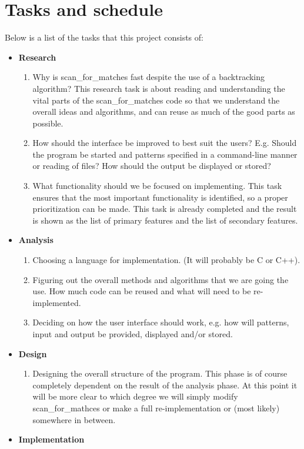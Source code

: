 \documentclass[12pt]{article}
\begin{document}
\section{Tasks and schedule}
Below is a list of the tasks that this project consists of:
\begin{itemize}
\item \textbf{Research} 
\begin{enumerate}
\item Why is scan\_for\_matches fast despite the use of a backtracking algorithm? This research task is about 
reading and understanding the vital parts of the scan\_for\_matches code so that we understand the overall
ideas and algorithms, and can reuse as much of the good parts as possible.
\item How should the interface be improved to best suit the users? E.g. Should the program be started and
patterns specified in a command-line manner or reading of files? How should the output be displayed or stored?
\item What functionality should we be focused on implementing. This task ensures that the most important functionality is 
identified, so a proper prioritization can be made. This task is already completed and the result is shown as the list
of primary features and the list of secondary features.
\end{enumerate}
\item \textbf{Analysis}
\begin{enumerate}
\item Choosing a language for implementation. (It will probably be C or C++).
\item Figuring out the overall methods and algorithms that we are going the use. How much code can be reused and
what will need to be re-implemented.
\item Deciding on how the user interface should work, e.g. how will patterns, input and output be provided, displayed 
and/or stored.
\end{enumerate}
\item \textbf{Design}
\begin{enumerate}
\item Designing the overall structure of the program. This phase is of course completely dependent on the result
of the analysis phase. At this point it will be more clear to which degree we will simply modify scan\_for\_mathces
or make a full re-implementation or (most likely) somewhere in between.
\end{enumerate}
\item \textbf{Implementation}

\end{itemize}
\end{document}
